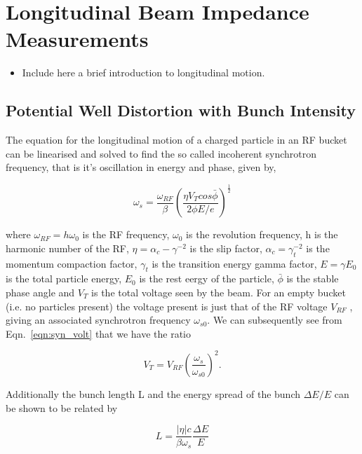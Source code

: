 \section{Longitudinal Beam Impedance Measurements}

\begin{itemize}
\item{Include here a brief introduction to longitudinal motion.}
\end{itemize}

\subsection{Potential Well Distortion with Bunch Intensity}
\label{sec:pot-well-dist}

The equation for the longitudinal motion of a charged particle in an RF bucket can be linearised and solved to find the so called incoherent synchrotron frequency, that is it's oscillation in energy and phase, given by,

\begin{equation}
\omega_{s} = \frac{\omega_{RF}}{\beta} \left( \frac{\eta V_{T}cos\bar{\phi}}{2\phi E/e}  \right)^{\frac{1}{2}}
\label{eqn:syn_volt}
\end{equation}

where $\omega_{RF} = h\omega_{0}$ is the RF frequency, $\omega_{0}$ is the revolution frequency, h is the harmonic
number of the RF, $\eta = \alpha_{c} - \gamma^{-2}$ is the slip factor, $\alpha_{c} = \gamma_{t}^{-2}$ is the momentum compaction factor, $\gamma_{t}$ is the transition energy gamma factor, $E=\gamma E_{0}$ is the total particle energy, $E_{0}$ is the rest eergy of the particle, $\bar{\phi}$ is the stable phase angle and $V_{T}$ is the total voltage seen by the beam. For an empty bucket (i.e. no particles present) the voltage present is just that of the RF voltage $V_{RF}$ , giving an associated synchrotron frequency $\omega_{s0}$. We can subsequently see from Eqn.~\ref{eqn:syn_volt} that we have the ratio

\begin{equation}
V_{T} = V_{RF}\left(  \frac{\omega_{s}}{\omega_{s0}} \right)^{2}.
\label{eqn:volt_emit}
\end{equation}

Additionally the bunch length L and the energy spread of the bunch $\Delta E/E$ can be shown to be related by

\begin{equation}
L = \frac{\left| \eta \right|c}{\beta\omega_{s}}\frac{\Delta E}{E}
\end{equation}

